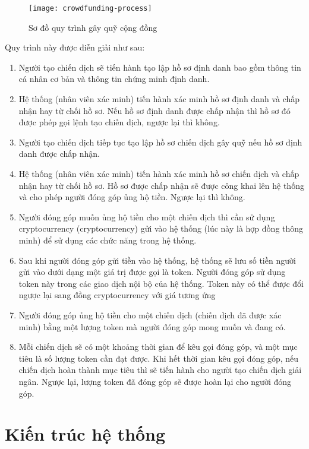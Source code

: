 \documentclass[../main-report.tex]{subfiles}
\begin{document}
\begin{figure}[ht!]
\begin{center}
\label{fig:crowdfunding-proccess}
\texttt{[image: crowdfunding-process]}
\caption{Sơ đồ quy trình gây quỹ cộng đồng}
\end{center}
\end{figure}

Quy trình này được diễn giải như sau:

\begin{enumerate}[label=(\arabic*)]
\item Người tạo chiến dịch sẽ tiến hành tạo lập hồ sơ định danh bao gồm thông tin cá nhân cơ bản và thông tin chứng minh định danh.
\item Hệ thống (nhân viên xác minh) tiến hành xác minh hồ sơ định danh và chấp nhận hay từ chối hồ sơ. Nếu hồ sơ định danh được chấp nhận thì hồ sơ đó được phép gọi lệnh tạo chiến dịch, ngược lại thì không.
\item Người tạo chiến dịch tiếp tục tạo lập hồ sơ chiến dịch gây quỹ nếu hồ sơ định danh được chấp nhận.
\item Hệ thống (nhân viên xác minh) tiến hành xác minh hồ sơ chiến dịch và chấp nhận hay từ chối hồ sơ. Hồ sơ được chấp nhận sẽ được công khai lên hệ thống và cho phép người đóng góp ủng hộ tiền. Ngược lại thì không.
\item Người đóng góp muốn ủng hộ tiền cho một chiến dịch thì cần sử dụng \gls{cryptocurrency} (\glsdesc{cryptocurrency}) gửi vào hệ thống (lúc này là hợp đồng thông minh) để sử dụng các chức năng trong hệ thống.
\item Sau khi người đóng góp gửi tiền vào hệ thống, hệ thống sẽ lưu số tiền người gửi vào dưới dạng một giá trị được gọi là token. Người đóng góp sử dụng token này trong các giao dịch nội bộ của hệ thống. Token này có thể được đổi ngược lại sang đồng \gls{cryptocurrency} với giá tương ứng
\item Người đóng góp ủng hộ tiền cho một chiến dịch (chiến dịch đã được xác minh) bằng một lượng token mà người đóng góp mong muốn và đang có.
\item Mỗi chiến dịch sẽ có một khoảng thời gian để kêu gọi đóng góp, và một mục tiêu là số lượng token cần đạt được. Khi hết thời gian kêu gọi đóng góp, nếu chiến dịch hoàn thành mục tiêu thì sẽ tiến hành cho người tạo chiến dịch giải ngân. Ngược lại, lượng token đã đóng góp sẽ được hoàn lại cho người đóng góp.
\end{enumerate}
\section{Kiến trúc hệ thống}
\end{document}
